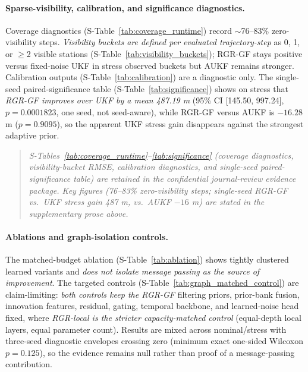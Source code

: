 \documentclass{article}
\begin{document}
\paragraph{Sparse-visibility, calibration, and significance diagnostics.}
Coverage diagnostics (S-Table~\ref{tab:coverage_runtime}) record $\sim$76--83\% zero-visibility steps. \emph{Visibility buckets are defined per evaluated trajectory-step} as 0, 1, or $\geq$2 visible stations (S-Table~\ref{tab:visibility_buckets}); RGR-GF stays positive versus fixed-noise UKF in stress observed buckets but AUKF remains stronger. Calibration outputs (S-Table~\ref{tab:calibration}) are a diagnostic only. The single-seed paired-significance table (S-Table~\ref{tab:significance}) shows on stress that \emph{RGR-GF improves over UKF by a mean 487.19 m} (95\% CI [145.50, 997.24], $p=0.0001823$, one seed, not seed-aware), while RGR-GF versus AUKF is $-16.28$ m ($p=0.9095$), so the apparent UKF stress gain disappears against the strongest adaptive prior.
\label{tab:coverage_runtime}%
\label{tab:visibility_buckets}%
\label{tab:calibration}%
\label{tab:significance}%
\begin{quote}\small
\emph{S-Tables~\ref{tab:coverage_runtime}--\ref{tab:significance} (coverage diagnostics, visibility-bucket RMSE, calibration diagnostics, and single-seed paired-significance table) are retained in the confidential journal-review evidence package. Key figures (76--83\% zero-visibility steps; single-seed RGR-GF vs.\ UKF stress gain 487 m, vs.\ AUKF $-16$ m) are stated in the supplementary prose above.}
\end{quote}

\paragraph{Ablations and graph-isolation controls.}
The matched-budget ablation (S-Table~\ref{tab:ablation}) shows tightly clustered learned variants and \emph{does not isolate message passing as the source of improvement}. The targeted controls (S-Table~\ref{tab:graph_matched_control}) are claim-limiting: \emph{both controls keep the RGR-GF} filtering priors, prior-bank fusion, innovation features, residual, gating, temporal backbone, and learned-noise head fixed, where \emph{RGR-local is the stricter capacity-matched control} (equal-depth local layers, equal parameter count). Results are mixed across nominal/stress with three-seed diagnostic envelopes crossing zero (minimum exact one-sided Wilcoxon \(p=0.125\)), so the evidence remains null rather than proof of a message-passing contribution.


\end{document}
